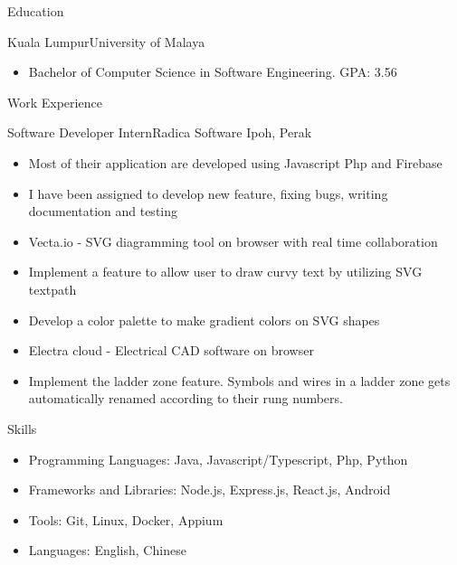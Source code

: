 \documentclass[]{mcdowellcv}
\begin{document}
\makeheader


\begin{cvsection}{Education}
	\begin{cvsubsection}{Kuala Lumpur}{University of Malaya}{}
		\begin{itemize}
			\item Bachelor of Computer Science in Software Engineering. GPA: 3.56
		\end{itemize}
	\end{cvsubsection}
\end{cvsection}
\begin{cvsection}{Work Experience}
	\begin{cvsubsection}{Software Developer Intern}{Radica Software}{}
		Ipoh, Perak
		\begin{itemize}%
			\item Most of their application are developed using Javascript Php and Firebase
			\item I have been assigned to develop new feature, fixing bugs, writing documentation and testing
			\item Vecta.io - SVG diagramming tool on browser with real time collaboration
			\item Implement a feature to allow user to draw curvy text by utilizing SVG textpath
			\item Develop a color palette to make gradient colors on SVG shapes
			\item Electra cloud - Electrical CAD software on browser
			\item Implement the ladder zone feature. Symbols and wires in a ladder zone gets automatically renamed according to their rung numbers.
		\end{itemize}
	\end{cvsubsection}
\end{cvsection}
\begin{cvsection}{Skills}
	\begin{cvsubsection}{}{}{}
		\begin{itemize}
			\item Programming Languages:  Java, Javascript/Typescript, Php, Python
			\item Frameworks and Libraries:  Node.js, Express.js, React.js, Android
			\item Tools:  Git, Linux, Docker, Appium
			\item Languages:  English, Chinese
		\end{itemize}
	\end{cvsubsection}
\end{cvsection}
\end{document}
